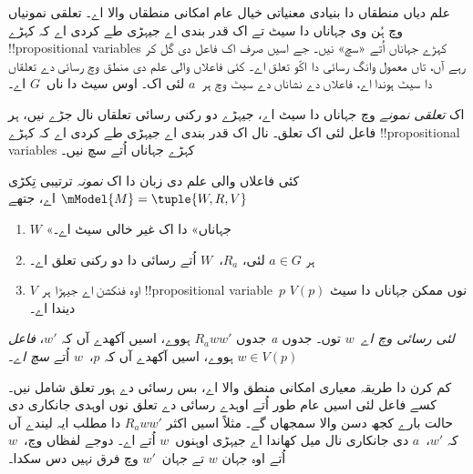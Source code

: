 \documentclass[../../../include/open-logic-section]{subfiles}
\begin{document}


علم دیاں منطقاں دا بنیادی معنیاتی خیال عام امکانی منطقاں والا اے۔
تعلقی نمونیاں وچ ہُن وی جہاناں دا سیٹ تے اک قدر بندی اے جیہڑی طے کردی
اے کہ کہڑے !!{propositional
variable}s کہڑے جہاناں اُتے «سچ» نیں۔ جے اسیں صرف اک فاعل دی گل
کر رہے آں، تاں معمول وانگ رسائی دا اکّو تعلق اے۔ کئی فاعلاں والی علم
دی منطق وچ رسائی دے تعلقاں دا سیٹ ہوندا اے، فاعلاں دے نشاناں دے
سیٹ وچ ہر~$a$ لئی اک۔ اوس سیٹ دا ناں~$G$ اے۔

اک \emph{تعلقی نمونے} وچ جہاناں دا سیٹ اے، جیہڑے دو رکنی رسائی
تعلقاں نال جڑے نیں، ہر فاعل لئی اک تعلق۔ نال اک قدر بندی اے جیہڑی
طے کردی اے کہ کہڑے !!{propositional variable}s کہڑے جہاناں اُتے سچ نیں۔

\begin{defn}
  کئی فاعلاں والی علم دی زبان دا اک \emph{نمونہ} ترتیبی تِکڑی
  $\mModel{M} = \tuple{W, R, V}$ اے، جتھے
  \begin{enumerate}
  \item $W$ «جہاناں» دا اک غیر خالی سیٹ اے۔
  \item ہر $a \in G$ لئی، $ {R}_a$،~$W$ اُتے رسائی دا دو رکنی تعلق اے۔
  \item $V$ اوہ فنکشن اے جیہڑا ہر !!{propositional
    variable}~$p$ نوں ممکن جہاناں دا سیٹ $V(p)$ دیندا اے۔
  \end{enumerate}
  جدوں $R_a ww'$ ہووے، اسیں آکھدے آں کہ $w'$، \emph{فاعل a لئی
  رسائی وچ اے}~$w$ توں۔ جدوں $w \in V(p)$ ہووے، اسیں آکھدے آں کہ
  $p$،~$w$ اُتے \emph{سچ اے}۔
\end{defn}

کم کرن دا طریقہ معیاری امکانی منطق والا اے، بس رسائی دے ہور تعلق
شامل نیں۔ کسے فاعل لئی اسیں عام طور اُتے اوہدے رسائی دے تعلق نوں
اوہدی جانکاری دی حالت بارے کجھ دسن والا سمجھاں گے۔ مثلاً اسیں اکثر
$R_a ww'$ دا مطلب ایہ لیندے آں کہ $w'$،~$a$ دی جانکاری نال میل
کھاندا اے جیہڑی اوہنوں~$w$ اُتے اے۔ دوجے لفظاں وچ،~$w$ اُتے اوہ
جہان $w$ تے جہان~$w'$ وچ فرق نہیں دس سکدا۔
\end{document}
